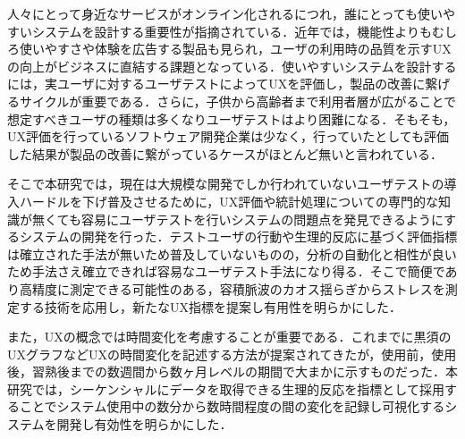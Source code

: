
\begin{jabstract}

人々にとって身近なサービスがオンライン化されるにつれ，誰にとっても使いやすいシステムを設計する重要性が指摘されている．近年では，機能性よりもむしろ使いやすさや体験を広告する製品も見られ，ユーザの利用時の品質を示すUXの向上がビジネスに直結する課題となっている．使いやすいシステムを設計するには，実ユーザに対するユーザテストによってUXを評価し，製品の改善に繋げるサイクルが重要である．さらに，子供から高齢者まで利用者層が広がることで想定すべきユーザの種類は多くなりユーザテストはより困難になる．そもそも，UX評価を行っているソフトウェア開発企業は少なく，行っていたとしても評価した結果が製品の改善に繋がっているケースがほとんど無いと言われている．

そこで本研究では，現在は大規模な開発でしか行われていないユーザテストの導入ハードルを下げ普及させるために，UX評価や統計処理についての専門的な知識が無くても容易にユーザテストを行いシステムの問題点を発見できるようにするシステムの開発を行った．テストユーザの行動や生理的反応に基づく評価指標は確立された手法が無いため普及していないものの，分析の自動化と相性が良いため手法さえ確立できれば容易なユーザテスト手法になり得る．そこで簡便であり高精度に測定できる可能性のある，容積脈波のカオス揺らぎからストレスを測定する技術を応用し，新たなUX指標を提案し有用性を明らかにした．

また，UXの概念では時間変化を考慮することが重要である．これまでに黒須のUXグラフなどUXの時間変化を記述する方法が提案されてきたが，使用前，使用後，習熟後までの数週間から数ヶ月レベルの期間で大まかに示すものだった．本研究では，シーケンシャルにデータを取得できる生理的反応を指標として採用することでシステム使用中の数分から数時間程度の間の変化を記録し可視化するシステムを開発し有効性を明らかにした．

\end{jabstract}


